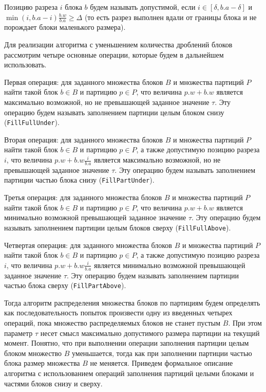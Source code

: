 \begin{definition}
Позицию разреза $i$ блока $b$ будем называть допустимой, если $i \in [\delta, b.a - \delta]$ и $\min(i, b.a - i)\frac{b.w}{b.a} \ge \Delta$ (то есть разрез выполнен вдали от границы блока и не порождает блоки маленького размера).
\end{definition}

Для реализации алгоритма с уменьшением количества дроблений блоков рассмотрим четыре основные операции, которые будем в дальнейшем использовать.

Первая операция: для заданного множества блоков $B$ и множества партиций $P$ найти такой блок $b \in B$ и партицию $p \in P$, что величина $p.w + b.w$ является максимально возможной, но не превышающей заданное значение $\tau$.
Эту операцию будем называть заполнением партиции целым блоком снизу (\texttt{FillFullUnder}).

Вторая операция: для заданного множества блоков $B$ и множества партиций $P$ найти такой блок $b \in B$ и партицию $p \in P$, а также допустимую позицию разреза $i$, что величина $p.w + b.w \frac{i}{b.a}$ является максимально возможной, но не превышающей заданное значение $\tau$.
Эту операцию будем называть заполнением партиции частью блока снизу (\texttt{FillPartUnder}).

Третья операция: для заданного множества блоков $B$ и множества партиций $P$ найти такой блок $b \in B$ и партицию $p \in P$, что величина $p.w + b.w$ является минимально возможной превышающей заданное значение $\tau$.
Эту операцию будем называть заполнением партиции целым блоков сверху (\texttt{FillFullAbove}).

Четвертая операция: для заданного множества блоков $B$ и множества партиций $P$ найти такой блок $b \in B$ и партицию $p \in P$, а также допустимую позицию разреза $i$, что величина $p.w + b.w \frac{i}{b.a}$ является минимально возможной превышающей заданное значение $\tau$.
Эту операцию будем называть заполнением партиции частью блока сверху (\texttt{FillPartAbove}).

Тогда алгоритм распределения множества блоков по партициям будем определять как последовательность попыток произвести одну из введенных четырех операций, пока множество распределяемых блоков не станет пустым $B$.
При этом параметр $\tau$ несет смысл максимально допустимого размера партиции на текущий момент.
Понятно, что при выполнении операции заполнения партиции целым блоком множество $B$ уменьшается, тогда как при заполнении партиции частью блока размер множества $B$ не меняется.
Приведем формальное описание алгоритма с использованием операций заполнения партиций целыми блоками и частями блоков снизу и сверху.

